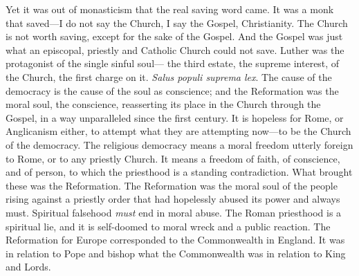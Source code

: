 \documentclass[12pt,a5paper,twoside]{book}
\begin{document}
Yet it was out of monasticism that the real saving 
word came. It was a monk that saved---I do not 
say the Church, I say the Gospel, Christianity. 
The Church is not worth saving, except for the sake 
of the Gospel. And the Gospel was just what an 
episcopal, priestly and Catholic Church could not save. 
Luther was the protagonist of the single sinful soul---
the third estate, the supreme interest, of the Church, 
the first charge on it. \textit{Salus populi suprema lex}. The 
cause of the democracy is the cause of the soul as conscience; 
and the Reformation was the moral soul, the 
conscience, reasserting its place in the Church through 
the Gospel, in a way unparalleled since the first century. 
It is hopeless for Rome, or Anglicanism either, to 
attempt what they are attempting now---to be the 
Church of the democracy. The religious democracy 
means a moral freedom utterly foreign to Rome, or to 
any priestly Church. It means a freedom of faith, of 
conscience, and of person, to which the priesthood is 
a standing contradiction. What brought these was 
the Reformation. The Reformation was the moral 
soul of the people rising against a priestly order that 
had hopelessly abused its power and always must. 
Spiritual falsehood \textit{must} end in moral abuse. The 
Roman priesthood is a spiritual lie, and it is self-doomed 
to moral wreck and a public reaction. The 
Reformation for Europe corresponded to the Commonwealth 
in England. It was in relation to Pope and 
bishop what the Commonwealth was in relation to 
King and Lords. 
\end{document}
